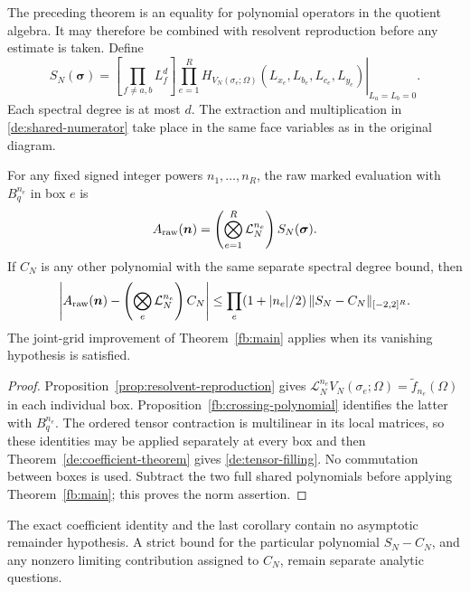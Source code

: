 The preceding theorem is an equality for polynomial
operators in the quotient algebra. It may therefore be combined with resolvent
reproduction before any estimate is taken. Define
\begin{equation}\label{de:shared-numerator}
 S_N(\boldsymbol\sigma)=
 \left[\prod_{f\ne a,b}L_f^d\right]
 \left.
 \prod_{e=1}^R H_{V_N(\sigma_e;\Omega)}
        (L_{x_e},L_{b_e},L_{c_e},L_{y_e})
 \right|_{L_a=L_b=0}.
\end{equation}
Each spectral degree is at most \(d\). The extraction and
multiplication in \eqref{de:shared-numerator} take place in the
same face variables as in the original diagram.

\begin{corollary}
\label{de:exact-filling}
For any fixed signed integer powers \(n_1,\ldots,n_R\), the
raw marked evaluation with \(B_q^{n_e}\) in box \(e\) is
\begin{equation}\label{de:tensor-filling}
 A_{\rm raw}(\boldsymbol n)
       =\left(\bigotimes_{e=1}^R\mathcal L_N^{n_e}\right)
                                        S_N(\boldsymbol\sigma).
\end{equation}
If \(C_N\) is any other polynomial with the same separate spectral
degree bound, then
\[
 \left|A_{\rm raw}(\boldsymbol n)
       -\left(\bigotimes_e\mathcal L_N^{n_e}\right)C_N\right|
 \le\prod_e(1+|n_e|/2)\,
                   \|S_N-C_N\|_{[-2,2]^R}.
\]
The joint-grid improvement of Theorem~\ref{fb:main} applies when
its vanishing hypothesis is satisfied.
\end{corollary}

\begin{proof}
Proposition~\ref{prop:resolvent-reproduction} gives
\(\mathcal L_N^{n_e}V_N(\sigma_e;\Omega)=
\widetilde f_{n_e}(\Omega)\) in each individual box.
Proposition~\ref{fb:crossing-polynomial} identifies the latter
with \(B_q^{n_e}\). The ordered tensor contraction is multilinear
in its local matrices, so these identities may be applied
separately at every box and then
Theorem~\ref{de:coefficient-theorem} gives
\eqref{de:tensor-filling}. No commutation between boxes is used.
Subtract the two full shared polynomials before applying
Theorem~\ref{fb:main}; this proves the norm assertion.
\end{proof}

The exact coefficient identity and the last corollary contain
no asymptotic remainder hypothesis. A strict bound for the
particular polynomial \(S_N-C_N\), and any nonzero limiting
contribution assigned to \(C_N\), remain separate analytic
questions.


